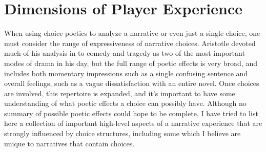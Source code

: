\section{Dimensions of Player Experience}

When using choice poetics to analyze a narrative or even just a single choice, one must consider the range of expressiveness of narrative choices.
%
Aristotle devoted much of his analysis in  to comedy and tragedy as two of the most important modes of drama in his day, but the full range of poetic effects is very broad, and includes both momentary impressions such as a single confusing sentence and overall feelings, such as a vague dissatisfaction with an entire novel.
%
Once choices are involved, this repertoire is expanded, and it's important to have some understanding of what poetic effects a choice can possibly have.
%
Although no summary of possible poetic effects could hope to be complete, I have tried to list here a collection of important high-level aspects of a narrative experience that are strongly influenced by choice structures, including some which I believe are unique to narratives that contain choices.


